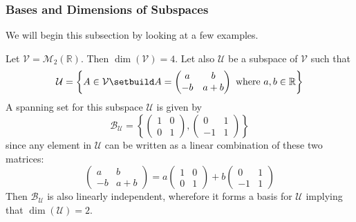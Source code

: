 \subsubsection{Bases and Dimensions of Subspaces}\label{subsubsec-bases-dim-subspaces}

\begin{flushleft}
	We will begin this subsection by looking at a few examples.
\end{flushleft}

\begin{exm}
	Let $\mathcal{V}=\mathcal{M}_2(\mathbb{R})$. Then $\dim(\mathcal{V})=4$.
	Let also $\mathcal{U}$ be a subspace of $\mathcal{V}$ such that
	\begin{equation*}
		\mathcal{U}=\left\{A\in\mathcal{V}\setbuild A=\begin{pmatrix}
			a  & b   \\
			-b & a+b
		\end{pmatrix}\text{ where }a,b\in\mathbb{R}\right\}
	\end{equation*}
	A spanning set for this subspace $\mathcal{U}$ is given by
	\begin{equation*}
		\mathcal{B}_\mathcal{U}=\left\{\begin{pmatrix}1&0\\0&1\end{pmatrix},
		\begin{pmatrix}0&1\\-1&1\end{pmatrix}\right\}
	\end{equation*}
	since any element in $\mathcal{U}$ can be written as a linear combination
	of these two matrices:
	\begin{equation*}
		\begin{pmatrix}
			a  & b   \\
			-b & a+b
		\end{pmatrix} =
		a\begin{pmatrix}
			1 & 0 \\
			0 & 1
		\end{pmatrix} +
		b\begin{pmatrix}
			0  & 1 \\
			-1 & 1
		\end{pmatrix}
	\end{equation*}
	Then $\mathcal{B}_\mathcal{U}$ is also linearly independent, wherefore
	it forms a basis for $\mathcal{U}$ implying that $\dim(\mathcal{U})=2$.
\end{exm}

